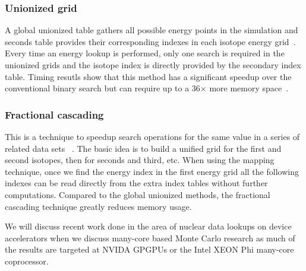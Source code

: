 \subsubsection*{ \textbf{Unionized grid} } A global unionized table gathers all possible energy points in the simulation and seconds table provides their corresponding indexes in each isotope energy grid~\cite{leppanen2009two}. Every time an energy lookup is performed, only one search is required in the unionized grids and the isotope index is directly provided by the secondary index table. Timing resutls show that this method has a significant speedup over the conventional binary search but can require up to a 36$\times$ more memory space~\cite{a.l.lunda.r.siegel2015}.
%
\subsubsection*{ \textbf{Fractional cascading} } This is a technique to speedup search operations for the same value in a series of related data sets ~\cite{a.l.lunda.r.siegel2015}. The basic idea is to build a unified grid for the first and second isotopes, then for seconds and third, etc. When using the mapping technique, once we find the energy index in the first energy grid all the following indexes can be read directly from the extra index tables without further computations. Compared to the global unionized methods, the fractional cascading technique greatly reduces memory usage.

%
We will discuss recent work done in the area of nuclear data lookups on device accelerators when we discuss many-core based Monte Carlo research as much of the results are targeted at NVIDA GPGPUs or the Intel XEON Phi many-core coprocessor. 
